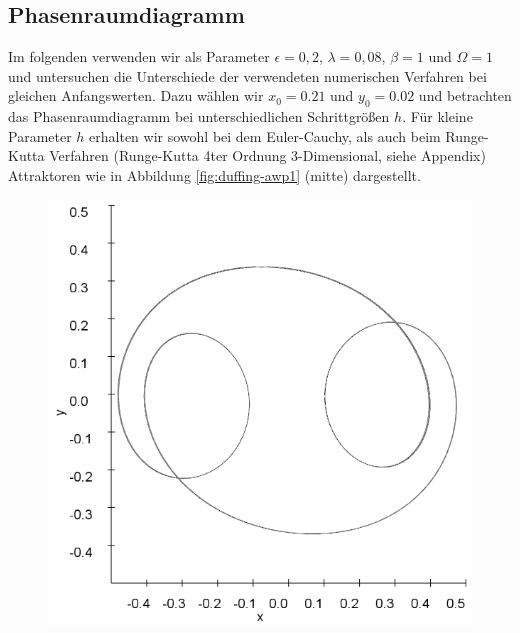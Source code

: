 \documentclass{scrartcl}
\begin{document}
\subsection { Phasenraumdiagramm }
Im folgenden verwenden wir als Parameter $\epsilon = 0,2$, $\lambda = 0,08$, $\beta = 1$ und $\Omega = 1$ und untersuchen die Unterschiede der verwendeten numerischen Verfahren bei gleichen Anfangswerten. Dazu wählen wir $x_0=0.21$ und $y_0=0.02$ und betrachten das Phasenraumdiagramm bei unterschiedlichen Schrittgrößen $h$. Für kleine Parameter $h$ erhalten wir sowohl bei dem Euler-Cauchy, als auch beim Runge-Kutta Verfahren (Runge-Kutta 4ter Ordnung 3-Dimensional, siehe Appendix) Attraktoren wie in Abbildung \ref{fig:duffing-awp1} (mitte) dargestellt. 
\begin{figure}[!htbp]
\includegraphics[scale=0.28]{duffing-awp1-500k-nach-500k-h0,1-euler}

\end{figure}
\end{document}
